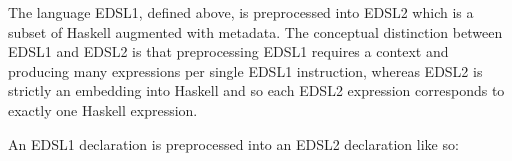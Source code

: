 %  
%   
 The language EDSL1, defined above, is preprocessed into EDSL2 which is a subset of Haskell augmented with metadata. 
 The conceptual distinction between EDSL1 and EDSL2 is that preprocessing EDSL1 requires a context and producing many expressions per single EDSL1 instruction, whereas EDSL2 is strictly an embedding into Haskell and so each EDSL2 expression corresponds to exactly one Haskell expression.
  
%  
 An EDSL1 declaration is preprocessed into an EDSL2 declaration like so:
  
